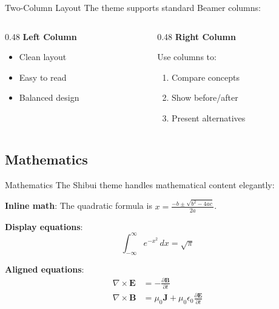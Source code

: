 \documentclass[aspectratio=169]{beamer}
\begin{document}
\begin{frame}{Two-Column Layout}
  The theme supports standard Beamer columns:

  \vspace{1em}

  \begin{columns}[T]
    \begin{column}{0.48\textwidth}
      \textbf{Left Column}

      \begin{itemize}
        \item Clean layout
        \item Easy to read
        \item Balanced design
      \end{itemize}
    \end{column}

    \begin{column}{0.48\textwidth}
      \textbf{Right Column}

      Use columns to:
      \begin{enumerate}
        \item Compare concepts
        \item Show before/after
        \item Present alternatives
      \end{enumerate}
    \end{column}
  \end{columns}
\end{frame}

\subsection{Mathematics}

\begin{frame}{Mathematics}
  The Shibui theme handles mathematical content elegantly:

  \vspace{1em}

  \textbf{Inline math}: The quadratic formula is $x = \frac{-b \pm \sqrt{b^2-4ac}}{2a}$.

  \vspace{1em}

  \textbf{Display equations}:
  \begin{equation}
    \int_{-\infty}^{\infty} e^{-x^2} \, dx = \sqrt{\pi}
  \end{equation}

  \vspace{0.5em}

  \textbf{Aligned equations}:
  \begin{align}
    \nabla \times \mathbf{E} &= -\frac{\partial \mathbf{B}}{\partial t} \\
    \nabla \times \mathbf{B} &= \mu_0 \mathbf{J} + \mu_0 \epsilon_0 \frac{\partial \mathbf{E}}{\partial t}
  \end{align}
\end{frame}
\end{document}
